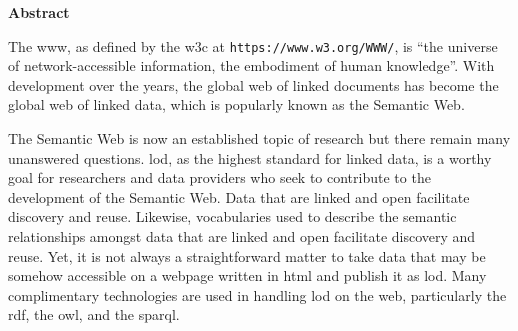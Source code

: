 
\begin{doublespace}
\begin{center}
\textbf{Abstract}
\end{center}

The \ac{www}, as defined by the \ac{w3c}
at {\tt https://www.w3.org/WWW/}, 
is ``the universe of network-accessible information, 
the embodiment of human knowledge''. 
With development 
over the years, 
the global web of linked documents has become the global web of linked data, 
which is popularly known as the Semantic Web.

The Semantic Web is now an established topic of research but there remain many unanswered questions.
\ac{lod}, as the highest standard for linked data, is a worthy goal for researchers and data providers
who seek to contribute to the development of the Semantic Web.
Data that are linked and open facilitate discovery and reuse.
Likewise, vocabularies used to describe the semantic relationships amongst data
that are linked and open facilitate discovery and reuse.
Yet, it is not always a straightforward matter to take data that may be somehow accessible on a webpage written in \ac{html} and publish it as \ac{lod}.
Many complimentary technologies are used in handling \ac{lod} on the web,
particularly the \ac{rdf}, the \ac{owl}, and the \ac{sparql}. 
 

\end{doublespace}